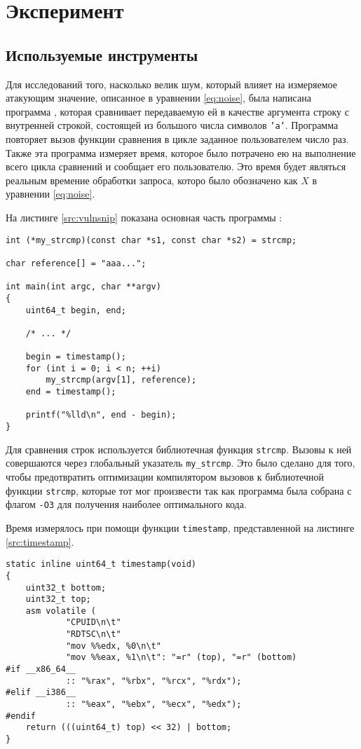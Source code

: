 \section{Эксперимент}

\subsection{Используемые инструменты}

Для исследований того, насколько велик шум, который влияет на измеряемое атакующим значение,
описанное в уравнении \ref{eq:noise}, была написана программа , которая сравнивает
передаваемую ей в качестве аргумента строку с внутренней строкой, состоящей из большого числа
символов \texttt{'a'}. Программа повторяет вызов функции сравнения в цикле заданное
пользователем число раз. Также эта программа измеряет время, которое было потрачено ею
на выполнение всего цикла сравнений и сообщает его пользователю. Это время будет являться
реальным времение обработки запроса, которо было обозначено как $X$ в уравнении \ref{eq:noise}.

На листинге \ref{src:vulnsnip} показана основная часть программы :

\begin{lstlisting}[caption=Фрагмент программы \texttt{vulnerable.c}, label=src:vulnsnip]
int (*my_strcmp)(const char *s1, const char *s2) = strcmp;

char reference[] = "aaa...";

int main(int argc, char **argv)
{
	uint64_t begin, end;

	/* ... */

	begin = timestamp();
	for (int i = 0; i < n; ++i)
		my_strcmp(argv[1], reference);
	end = timestamp();

	printf("%lld\n", end - begin);
}
\end{lstlisting}

Для сравнения строк используется библиотечная функция \texttt{strcmp}. Вызовы к ней совершаются
через глобальный указатель \texttt{my\_strcmp}. Это было сделано для того, чтобы предотвратить оптимизации
компилятором вызовов к библиотечной функции \texttt{strcmp}, которые тот мог произвести так как программа
была собрана с флагом \texttt{-O3} для получения наиболее оптимального кода.

Время измерялось при помощи функции \texttt{timestamp}, представленной на листинге
\ref{src:timestamp}.

\begin{lstlisting}[caption=Функция \texttt{timestamp}, label=src:timestamp]
static inline uint64_t timestamp(void)
{
	uint32_t bottom;
	uint32_t top;
	asm volatile (
			"CPUID\n\t"
			"RDTSC\n\t"
			"mov %%edx, %0\n\t"
			"mov %%eax, %1\n\t": "=r" (top), "=r" (bottom)
#if __x86_64__
			:: "%rax", "%rbx", "%rcx", "%rdx");
#elif __i386__
			:: "%eax", "%ebx", "%ecx", "%edx");
#endif
	return (((uint64_t) top) << 32) | bottom;
}
\end{lstlisting}

